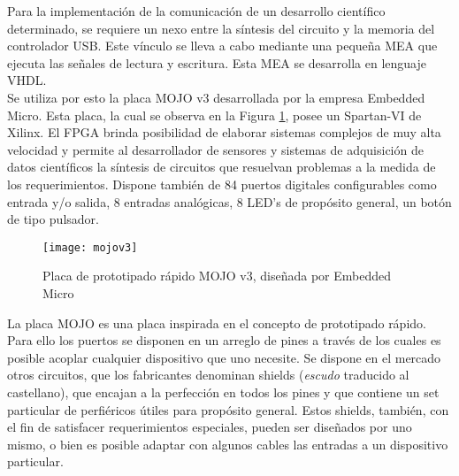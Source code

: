 
Para la implementación de la comunicación de un desarrollo científico determinado, se requiere un nexo entre la síntesis del circuito y la memoria del controlador USB. Este vínculo se lleva a cabo mediante una pequeña MEA que ejecuta las señales de lectura y escritura. Esta MEA se desarrolla en lenguaje VHDL.\\

Se utiliza por esto la placa MOJO v3 desarrollada por la empresa Embedded Micro. Esta placa, la cual se observa en la Figura \ref{mojo}, posee un Spartan-VI de Xilinx. El FPGA brinda posibilidad de elaborar sistemas complejos de muy alta velocidad y permite al desarrollador de sensores y sistemas de adquisición de datos científicos la síntesis de circuitos que resuelvan problemas a la medida de los requerimientos. Dispone también de 84 puertos digitales configurables como entrada y/o salida, 8 entradas analógicas, 8 LED's de propósito general, un botón de tipo pulsador.\\

\begin{figure}
	\centering
	\texttt{[image: mojov3]}
	\caption{Placa de prototipado rápido MOJO v3, diseñada por Embedded Micro}
	\label{mojo}
\end{figure}

La placa MOJO es una placa inspirada en el concepto de prototipado rápido. Para ello los puertos se disponen en un arreglo de pines a través de los cuales es posible acoplar cualquier dispositivo que uno necesite. Se dispone en el mercado otros circuitos, que los fabricantes denominan shields ({\it escudo} traducido al castellano), que encajan a la perfección en todos los pines y que contiene un set particular de perfiéricos útiles para propósito general. Estos shields, también, con el fin de satisfacer requerimientos especiales, pueden ser diseñados por uno mismo, o bien es posible adaptar con algunos cables las entradas a un dispositivo particular.\\

